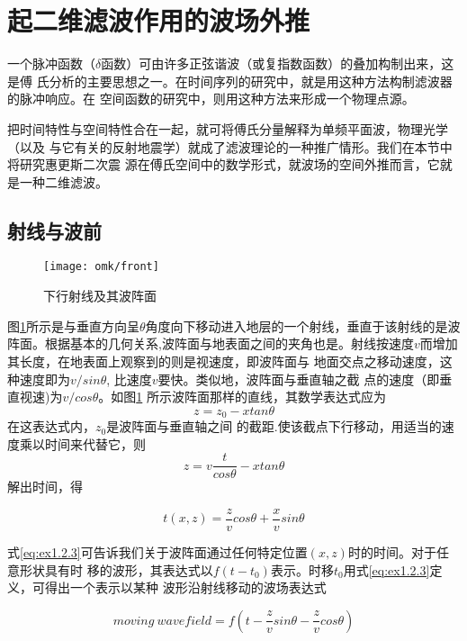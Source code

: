 \section{起二维滤波作用的波场外推}
一个脉冲函数（$\delta$函数）可由许多正弦谐波（或复指数函数）的叠加构制出来，这是傅
氏分析的主要思想之一。在时间序列的研究中，就是用这种方法构制滤波器的脉冲响应。在
空间函数的研究中，则用这种方法来形成一个物理点源。

把时间特性与空间特性合在一起，就可将傅氏分量解释为单频平面波，物理光学（以及
与它有关的反射地震学）就成了滤波理论的一种推广情形。我们在本节中将研究惠更斯二次震
源在傅氏空间中的数学形式，就波场的空间外推而言，它就是一种二维滤波。
\subsection{射线与波前}
\begin{figure}[H]
\centering
\texttt{[image: omk/front]}
\caption[front]{下行射线及其波阵面}
\label{fig:omk/front}
\end{figure}
  图\ref{fig:omk/front}所示是与垂直方向呈$\theta$角度向下移动进入地层的一个射线，垂直于该射线的是波
  阵面。根据基本的几何关系,波阵面与地表面之间的夹角也是。射线按速度$v$而增加其长度，在地表面上观察到的则是视速度，即波阵面与
  地面交点之移动速度，这种速度即为$v/sin\theta$,
  比速度$v$要快。类似地，波阵面与垂直轴之截
  点的速度（即垂直视速)为$v/cos\theta$。如图\ref{fig:omk/front}
  所示波阵面那样的直线，其数学表达式应为
  \begin{equation}
  z=z_{0}-xtan\theta
  \label{eq:ex1.2.1}
  \end{equation}
    在这表达式内，$z_{0}$是波阵面与垂直轴之间
    的截距.使该截点下行移动，用适当的速度乘以时间来代替它，则
  \begin{equation}
  z=v\frac{t}{cos\theta}-xtan\theta
  \label{eq:ex1.2.2}
  \end{equation}
    解出时间，得

  \begin{equation}
  t(x,z)=\frac{z}{v}cos\theta+\frac{x}{v}sin\theta
  \label{eq:ex1.2.3}
  \end{equation}

  式\ref{eq:ex1.2.3}可告诉我们关于波阵面通过任何特定位置$(x,z)$时的时间。对于任意形状具有时
  移的波形，其表达式以$f(t-t_{0})$表示。时移$t_{0}$用式\ref{eq:ex1.2.3}定义，可得出一个表示以某种
  波形沿射线移动的波场表达式

  \begin{equation}
  moving\ wavefield = f(t-\frac{z}{v}sin\theta-\frac{z}{v}cos\theta)
  \label{eq:ex1.2.4}
  \end{equation}

